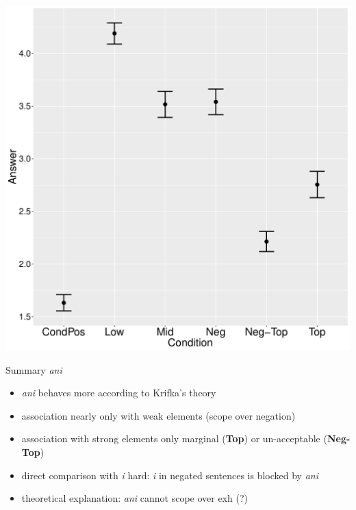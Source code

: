 \documentclass[ignorenonframetext,]{beamer}
\providecommand{\tightlist}{%
  \setlength{\itemsep}{0pt}\setlength{\parskip}{0pt}}
\newcommand{\cond}[1]{\textbf{#1}}
\begin{document}
\begin{frame}

\begin{center}
\includegraphics[scale=0.23]{exp1-ani-part_1-2-errorbars.pdf}
\end{center}

\end{frame}

\begin{frame}{Summary \emph{ani}}

\begin{itemize}
\tightlist
\item
  \emph{ani} behaves more according to Krifka's theory
\item
  association nearly only with weak elements (scope over negation)
\item
  association with strong elements only marginal (\cond{Top}) or
  un-acceptable (\cond{Neg-Top})
\item
  direct comparison with \emph{i} hard: \emph{i} in negated sentences is
  blocked by \emph{ani}
\item
  theoretical explanation: \emph{ani} cannot scope over exh (?)
\end{itemize}

\end{frame}
\end{document}

